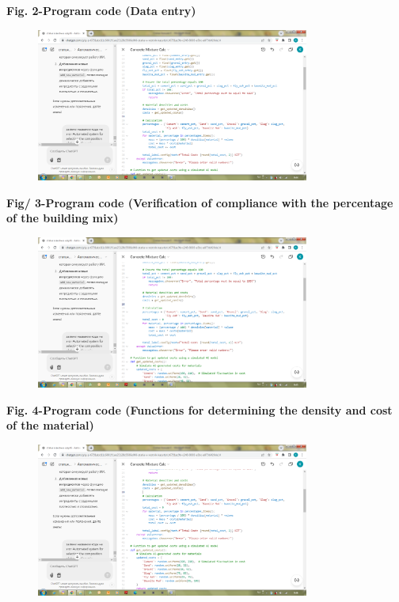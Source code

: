 {{\bfseries Fig. 2-Program code (Data entry)}

\begin{figure}[H]
	\centering
	\includegraphics[width=0.8\textwidth]{media/ict3/image4}
	\caption*{}
\end{figure}


{\bfseries Fig/ 3-Program code (Verification of compliance with the
percentage of the building mix)}

\begin{figure}[H]
	\centering
	\includegraphics[width=0.8\textwidth]{media/ict3/image5}
	\caption*{}
\end{figure}


{\bfseries Fig. 4-Program code (Functions for determining the density and
cost of the material)}

\begin{figure}[H]
	\centering
	\includegraphics[width=0.8\textwidth]{media/ict3/image6}
	\caption*{}
\end{figure}


}
